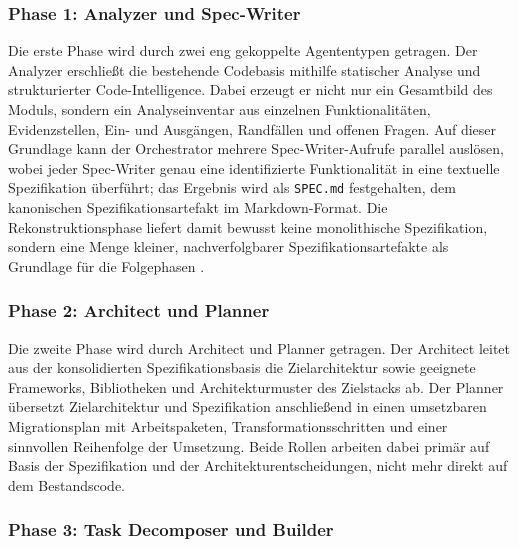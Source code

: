 \subsubsection{Phase 1: Analyzer und Spec-Writer}

Die erste Phase wird durch zwei eng gekoppelte Agententypen getragen. Der Analyzer erschließt die bestehende Codebasis mithilfe statischer Analyse und strukturierter Code-Intelligence. Dabei erzeugt er nicht nur ein Gesamtbild des Moduls, sondern ein Analyseinventar aus einzelnen Funktionalitäten, Evidenzstellen, Ein- und Ausgängen, Randfällen und offenen Fragen. Auf dieser Grundlage kann der Orchestrator mehrere Spec-Writer-Aufrufe parallel auslösen, wobei jeder Spec-Writer genau eine identifizierte Funktionalität in eine textuelle Spezifikation überführt; das Ergebnis wird als \texttt{SPEC.md} festgehalten, dem kanonischen Spezifikationsartefakt im Markdown-Format. Die Rekonstruktionsphase liefert damit bewusst keine monolithische Spezifikation, sondern eine Menge kleiner, nachverfolgbarer Spezifikationsartefakte als Grundlage für die Folgephasen \parencite{midolo2026promptguidelines,eniser2025realworld}.

\subsubsection{Phase 2: Architect und Planner}

Die zweite Phase wird durch Architect und Planner getragen. Der Architect leitet aus der konsolidierten Spezifikationsbasis die Zielarchitektur sowie geeignete Frameworks, Bibliotheken und Architekturmuster des Zielstacks ab. Der Planner übersetzt Zielarchitektur und Spezifikation anschließend in einen umsetzbaren Migrationsplan mit Arbeitspaketen, Transformationsschritten und einer sinnvollen Reihenfolge der Umsetzung. Beide Rollen arbeiten dabei primär auf Basis der Spezifikation und der Architekturentscheidungen, nicht mehr direkt auf dem Bestandscode.

\subsubsection{Phase 3: Task Decomposer und Builder}


